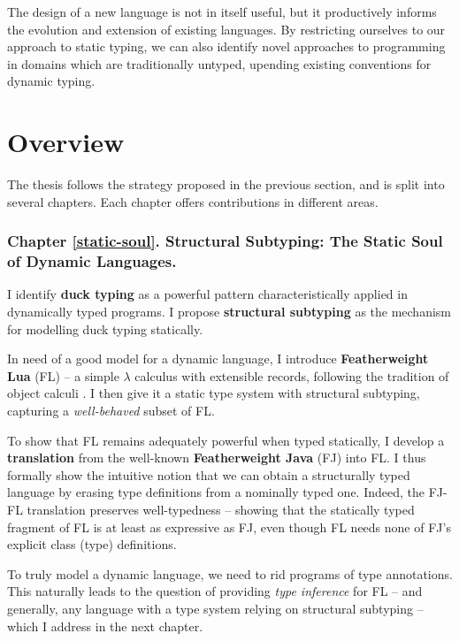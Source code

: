 The design of a new language is not in itself useful, but it productively informs the evolution and extension of existing languages.
By restricting ourselves to our approach to static typing, we can also identify novel approaches to programming in domains which are traditionally untyped, upending existing conventions for dynamic typing. 

\section{Overview}

The thesis follows the strategy proposed in the previous section, and is split into several chapters. Each chapter offers contributions in different areas.

\subsubsection{Chapter \ref{static-soul}. Structural Subtyping: The Static Soul of Dynamic Languages.} 

I identify \textbf{duck typing} as a powerful pattern characteristically applied in dynamically typed programs. I propose \textbf{structural subtyping} as the mechanism for modelling duck typing statically. 

In need of a good model for a dynamic language, I introduce \textbf{Featherweight Lua} (FL) -- a simple $\lambda$ calculus with extensible records, following the tradition of object calculi \cite{abadi-cardelli-object-calculus}. I then give it a static type system with structural subtyping, capturing a \emph{well-behaved} subset of FL.

To show that FL remains adequately powerful when typed statically, I develop a \textbf{translation} from the well-known \textbf{Featherweight Java} (FJ) \cite{featherweight-java} into FL. 
I thus formally show the intuitive notion that we can obtain a structurally typed language by erasing type definitions from a nominally typed one.
Indeed, the FJ-FL translation preserves well-typedness -- showing that the statically typed fragment of FL is at least as expressive as FJ, even though FL needs none of FJ's explicit class (type) definitions. 

To truly model a dynamic language, we need to rid programs of type annotations. This naturally leads to the question of providing \emph{type inference} for FL -- and generally, any language with a type system relying on structural subtyping -- which I address in the next chapter.

